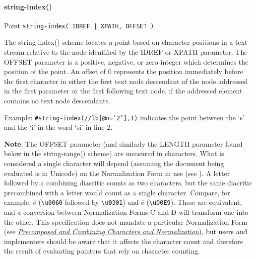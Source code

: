 \paragraph[{string-index()}]{string-index()}\label{SATSSI}\par
Point \texttt{string-index( IDREF | XPATH, OFFSET )}\par
The  {\name string-index()} scheme locates a point based on character positions in a text stream relative to the node identified by the IDREF or XPATH parameter. The OFFSET parameter is a positive, negative, or zero integer which determines the position of the point. An offset of 0 represents the position immediately before the first character in either the first text node descendant of the node addressed in the first parameter or the first following text node, if the addressed element contains no text node descendants.\par
Example: \texttt{\#string-index(//lb[@n='2'],1)} indicates the point between the ‘s’ and the ‘i’ in the word ‘si’ in line 2.\par
{\bfseries Note}: The OFFSET parameter (and similarly the LENGTH parameter found below in the  {\name string-range()} scheme) are measured in characters. What is considered a single character will depend (assuming the document being evaluated is in Unicode) on the Normalization Form in use (see ). A letter followed by a combining diacritic counts as two characters, but the same diacritic precombined with a letter would count as a single character. Compare, for example, é (\texttt{\textbackslash u0060} followed by \texttt{\textbackslash u0301}) and é (\texttt{\textbackslash u00E9}). These are equivalent, and a conversion between Normalization Forms C and D will transform one into the other. This specification does not mandate a particular Normalization Form (see \textit{\hyperref[D4-46-2]{Precomposed and Combining Characters and Normalization}}), but users and implementers should be aware that it affects the character count and therefore the result of evaluating pointers that rely on character counting.
